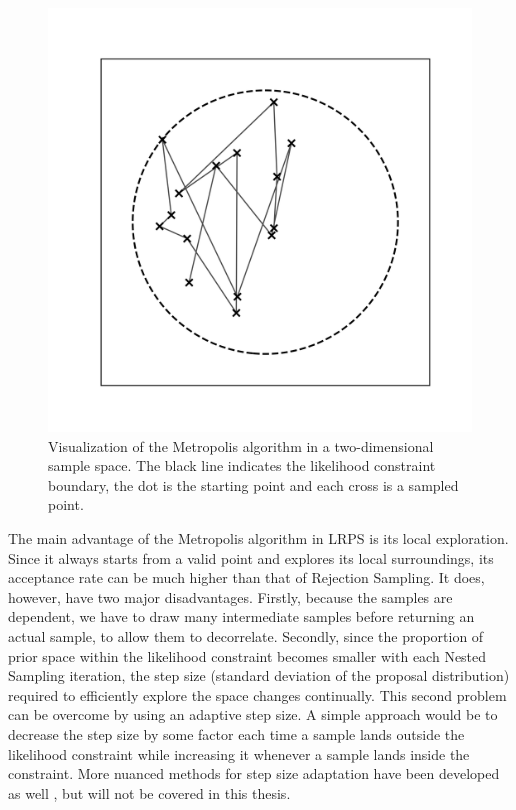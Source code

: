 \documentclass[12pt, a4paper]{report}
\begin{document}
\begin{figure}
    \centering
    \includegraphics[scale=0.5]{figs/metropolis_example.png}
    \caption{Visualization of the Metropolis algorithm in a two-dimensional sample space. The black line indicates the likelihood constraint boundary, the dot is the starting point and each cross is a sampled point.}
    \label{fig:metropolis_example}
\end{figure}

The main advantage of the Metropolis algorithm in LRPS is its local exploration.
Since it always starts from a valid point and explores its local surroundings, its acceptance rate can be much higher than that of Rejection Sampling.
It does, however, have two major disadvantages.
Firstly, because the samples are dependent, we have to draw many intermediate samples before returning an actual sample, to allow them to decorrelate.
Secondly, since the proportion of prior space within the likelihood constraint becomes smaller with each Nested Sampling iteration, the step size (standard deviation of the proposal distribution) required to efficiently explore the space changes continually.
This second problem can be overcome by using an adaptive step size.
A simple approach would be to decrease the step size by some factor each time a sample lands outside the likelihood constraint while increasing it whenever a sample lands inside the constraint.
More nuanced methods for step size adaptation have been developed as well \cite{automala}, but will not be covered in this thesis.
\end{document}
